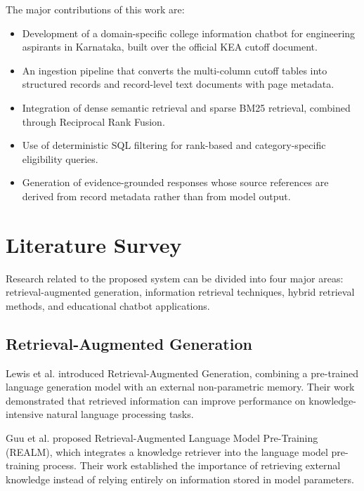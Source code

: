 \documentclass[conference]{IEEEtran}
\begin{document}
The major contributions of this work are:

\begin{itemize}
    \item Development of a domain-specific college
    information chatbot for engineering aspirants
    in Karnataka, built over the official KEA cutoff
    document.

    \item An ingestion pipeline that converts the
    multi-column cutoff tables into structured records
    and record-level text documents with page metadata.

    \item Integration of dense semantic retrieval
    and sparse BM25 retrieval, combined through
    Reciprocal Rank Fusion.

    \item Use of deterministic SQL filtering for
    rank-based and category-specific eligibility
    queries.

    \item Generation of evidence-grounded responses
    whose source references are derived from record
    metadata rather than from model output.
\end{itemize}

\section{Literature Survey}

Research related to the proposed system can be divided
into four major areas: retrieval-augmented generation,
information retrieval techniques, hybrid retrieval
methods, and educational chatbot applications.

\subsection{Retrieval-Augmented Generation}

Lewis et al. \cite{Lewis2020} introduced Retrieval-Augmented
Generation, combining a pre-trained language generation
model with an external non-parametric memory. Their work
demonstrated that retrieved information can improve
performance on knowledge-intensive natural language
processing tasks.

Guu et al. \cite{REALM2020} proposed Retrieval-Augmented
Language Model Pre-Training (REALM), which integrates
a knowledge retriever into the language model
pre-training process. Their work established the
importance of retrieving external knowledge instead
of relying entirely on information stored in model
parameters.
\end{document}
